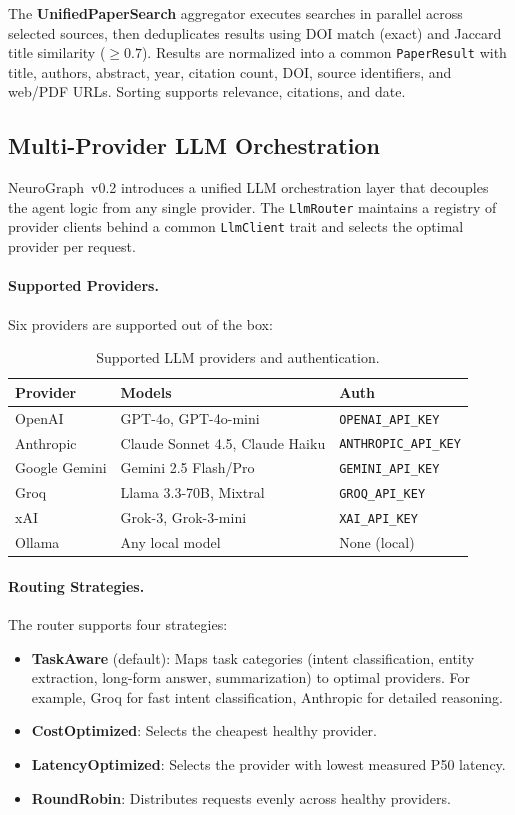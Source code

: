 \documentclass[11pt,twocolumn]{article}
\begin{document}
The \textbf{UnifiedPaperSearch} aggregator executes searches in parallel across selected sources, then deduplicates results using DOI match (exact) and Jaccard title similarity ($\geq 0.7$). Results are normalized into a common \texttt{PaperResult} with title, authors, abstract, year, citation count, DOI, source identifiers, and web/PDF URLs. Sorting supports relevance, citations, and date.

\subsection{Multi-Provider LLM Orchestration}
\label{sec:llm-router}

NeuroGraph~v0.2 introduces a unified LLM orchestration layer that decouples the agent logic from any single provider. The \texttt{LlmRouter} maintains a registry of provider clients behind a common \texttt{LlmClient} trait and selects the optimal provider per request.

\paragraph{Supported Providers.} Six providers are supported out of the box:

\begin{table}[h]
\centering\small
\begin{tabular}{@{}lll@{}}
\toprule
\textbf{Provider} & \textbf{Models} & \textbf{Auth} \\
\midrule
OpenAI & GPT-4o, GPT-4o-mini & \texttt{OPENAI\_API\_KEY} \\
Anthropic & Claude Sonnet 4.5, Claude Haiku & \texttt{ANTHROPIC\_API\_KEY} \\
Google Gemini & Gemini 2.5 Flash/Pro & \texttt{GEMINI\_API\_KEY} \\
Groq & Llama 3.3-70B, Mixtral & \texttt{GROQ\_API\_KEY} \\
xAI & Grok-3, Grok-3-mini & \texttt{XAI\_API\_KEY} \\
Ollama & Any local model & None (local) \\
\bottomrule
\end{tabular}
\caption{Supported LLM providers and authentication.}
\end{table}

\paragraph{Routing Strategies.} The router supports four strategies:
\begin{itemize}[nosep]
  \item \textbf{TaskAware} (default): Maps task categories (intent classification, entity extraction, long-form answer, summarization) to optimal providers. For example, Groq for fast intent classification, Anthropic for detailed reasoning.
  \item \textbf{CostOptimized}: Selects the cheapest healthy provider.
  \item \textbf{LatencyOptimized}: Selects the provider with lowest measured P50 latency.
  \item \textbf{RoundRobin}: Distributes requests evenly across healthy providers.
\end{itemize}
\end{document}
